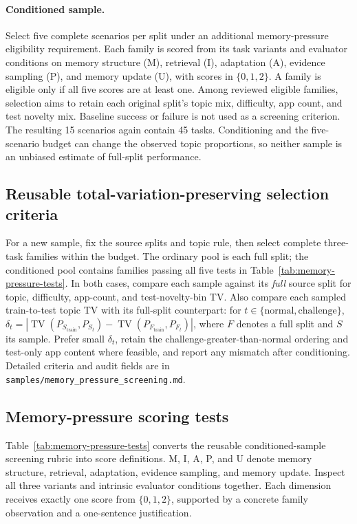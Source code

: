 \documentclass[11pt]{article}
\begin{document}
\paragraph{Conditioned sample.}
Select five complete scenarios per split under an additional memory-pressure
eligibility requirement. Each family is scored from its task variants and
evaluator conditions on memory structure (M), retrieval (I), adaptation (A),
evidence sampling (P), and memory update (U), with scores in
\(\{0,1,2\}\). A family is eligible only if all five scores are at least
one. Among reviewed eligible families, selection aims to retain each original
split's topic mix, difficulty, app count, and test novelty mix. Baseline
success or failure is not used as a screening criterion. The resulting
15 scenarios again contain 45 tasks. Conditioning and the five-scenario
budget can change the observed topic proportions, so neither sample is an
unbiased estimate of full-split performance.

\subsection{Reusable total-variation-preserving selection criteria}

For a new sample, fix the source splits and topic rule, then select complete
three-task families within the budget. The ordinary pool is each full split;
the conditioned pool contains families passing all five tests in
Table~\ref{tab:memory-pressure-tests}. In both cases, compare each sample
against its \emph{full} source split for topic, difficulty, app-count, and
test-novelty-bin TV. Also compare each sampled train-to-test topic TV with its
full-split counterpart: for \(t\in\{\mathrm{normal},\mathrm{challenge}\}\),
\(\delta_t=|\operatorname{TV}(P_{S_{\mathrm{train}}},P_{S_t})-
\operatorname{TV}(P_{F_{\mathrm{train}}},P_{F_t})|\), where \(F\) denotes a
full split and \(S\) its sample. Prefer small \(\delta_t\), retain the
challenge-greater-than-normal ordering and test-only app content where
feasible, and report any mismatch after conditioning. Detailed criteria and
audit fields are in \texttt{samples/memory\_pressure\_screening.md}.

\clearpage
\subsection{Memory-pressure scoring tests}

Table~\ref{tab:memory-pressure-tests} converts the reusable conditioned-sample
screening rubric into score definitions. M, I, A, P, and U denote memory
structure, retrieval, adaptation, evidence sampling, and memory update.
Inspect all three variants and intrinsic evaluator conditions together. Each
dimension receives exactly one score from \(\{0,1,2\}\), supported by a
concrete family observation and a one-sentence justification.
\end{document}
